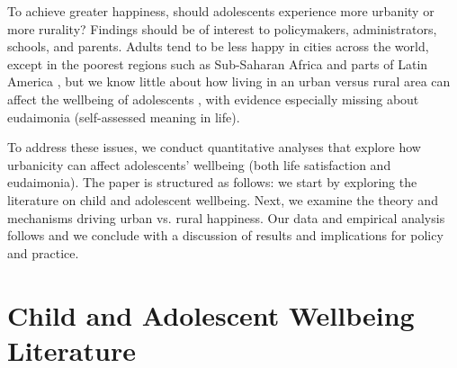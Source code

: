 \documentclass[11pt, letterpaper]{article}
\begin{document}
\begin{spacing}{1.9}
To achieve greater happiness, should adolescents experience more urbanity or more rurality? Findings should be of interest to policymakers, administrators, schools, and 
parents. Adults tend to be less happy in cities across the world, 
except in the poorest regions such as Sub-Saharan Africa and parts of Latin
America \citep{aok21,valente2016}, but we know little about how living in an
urban versus rural area can affect the wellbeing of adolescents
\citep{marquez24}, with evidence especially missing about eudaimonia (self-assessed meaning in life).  

To address these issues,  we conduct quantitative analyses that explore how
urbanicity can affect adolescents'  wellbeing (both life satisfaction and
eudaimonia). The paper is structured as follows: we start by exploring the
literature on child and adolescent wellbeing. Next, we examine the theory and
mechanisms driving urban vs. rural happiness. %
Our data and
empirical analysis follows and we conclude with a discussion of results and
implications for policy and practice.


\section*{Child and Adolescent  Wellbeing Literature}




\end{spacing}
\end{document}
